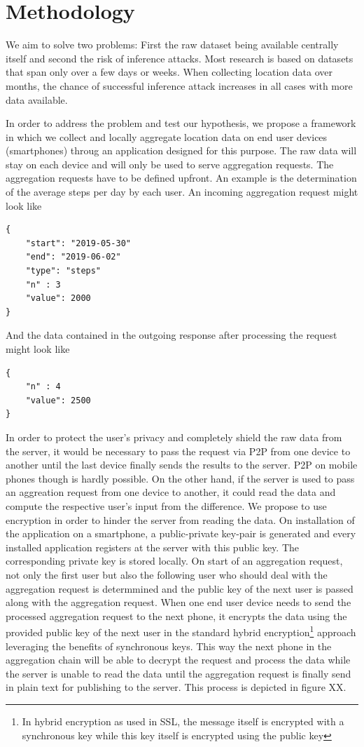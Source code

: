 \chapter{Methodology}\label{chapter:method}
We aim to solve two problems: First the raw dataset being available centrally itself and second the risk of inference attacks. Most research is based on datasets that span only over a few days or weeks. When collecting location data over months, the chance of successful inference attack increases in all cases with more data available.

In order to address the problem and test our hypothesis, we propose a framework in which we collect and locally aggregate location data on end user devices (smartphones) throug an application designed for this purpose. The raw data will stay on each device and will only be used to serve aggregation requests. The aggregation requests have to be defined upfront. An example is the determination of the average steps per day by each user. An incoming aggregation request might look like
\begin{verbatim}
{
	"start": "2019-05-30"
	"end": "2019-06-02"
	"type": "steps"
	"n" : 3
	"value": 2000
}
\end{verbatim}
And the data contained in the outgoing response after processing the request might look like
\begin{verbatim}
{
	"n" : 4
	"value": 2500
}
\end{verbatim}
 In order to protect the user's privacy and completely shield the raw data from the server, it would be necessary to pass the request via P2P from one device to another until the last device finally sends the results to the server. P2P on mobile phones though is hardly possible. On the other hand, if the server is used to pass an aggreation request from one device to another, it could read the data and compute the respective user's input from the difference. We propose to use encryption in order to hinder the server from reading the data. On installation of the application on a smartphone, a public-private key-pair is generated and every installed application registers at the server with this public key. The corresponding private key is stored locally. On start of an aggregation request, not only the first user but also the following user who should deal with the aggregation request is determmined and the public key of the next user is passed along with the aggregation request. When one end user device needs to send the processed aggregation request to the next phone, it encrypts the data using the provided public key of the next user in the standard hybrid encryption\footnote{In hybrid encryption as used in SSL, the message itself is encrypted with a synchronous key while this key itself is encrypted using the public key} approach leveraging the benefits of synchronous keys. This way the next phone in the aggregation chain will be able to decrypt the request and process the data while the server is unable to read the data until the aggregation request is finally send in plain text for publishing to the server. This process is depicted in figure XX.

